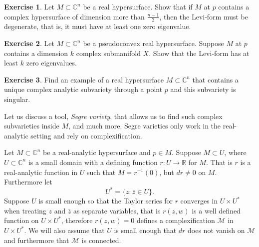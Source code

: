 \documentclass[12pt,openany]{book}
\newcommand{\C}{{\mathbb{C}}}
\newcommand{\R}{{\mathbb{R}}}
\newcommand{\sM}{{\mathcal{M}}}
\newcommand{\myindex}[1]{#1\index{#1}}
\theoremstyle{plain}
\theoremstyle{remark}
\theoremstyle{definition}
\newenvironment{exbox}{%
    \def\FrameCommand{\vrule width 1pt \relax\hspace {10pt}}%
    \MakeFramed {\advance \hsize -\width \FrameRestore }%
}{%
    \endMakeFramed
}
\theoremstyle{exercise}
\newtheorem{exercise}{Exercise}[section]
\theoremstyle{example}
\begin{document}
\begin{exbox}
\begin{exercise}
Let $M \subset \C^n$ be a real hypersurface.
Show that if $M$ at $p$ contains a complex hypersurface of dimension more than
$\frac{n-1}{2}$, then the Levi-form must be degenerate, that is, it must
have at least one zero eigenvalue.
\end{exercise}

\begin{exercise}
Let $M \subset \C^n$ be a pseudoconvex real hypersurface.
Suppose $M$ at $p$ contains a dimension $k$ complex submanifold $X$.
Show that the Levi-form has at least $k$ zero eigenvalues.
\end{exercise}

\begin{exercise}
Find an example of a real hypersurface $M \subset \C^n$ that contains a unique complex
analytic subvariety through a point $p$ and this subvariety is singular.
\end{exercise}
\end{exbox}


Let us discuss a tool, \emph{\myindex{Segre variety}}, that allows us to
find such complex subvarieties inside $M$, and much more.  Segre varieties only
work in the real-analytic setting and rely on complexification.

Let $M \subset \C^n$ be a real-analytic hypersurface and $p \in M$.
Suppose $M \subset U$,
where $U \subset \C^n$ is a small domain with a defining function $r \colon
U  \to \R$ for $M$.  That is $r$ is a real-analytic function in $U$ such that
$M = r^{-1}(0)$, but
$dr \not= 0$ on $M$.  Furthermore let
\begin{equation*}
U^* = \{ z : \bar{z} \in U \} .
\end{equation*}
Suppose $U$ is small enough so that the Taylor series for $r$
converges in $U \times U^*$ when treating $z$ and $\bar{z}$ as separate
variables, that is $r(z,w)$ is a well defined function on
$U \times U^*$, therefore $r(z,w) = 0$ defines a complexification $\sM$
in $U \times U^*$.  We will also assume that $U$ is small enough that
$dr$ does not vanish on $\sM$ and furthermore that $\sM$ is connected.
\end{document}
